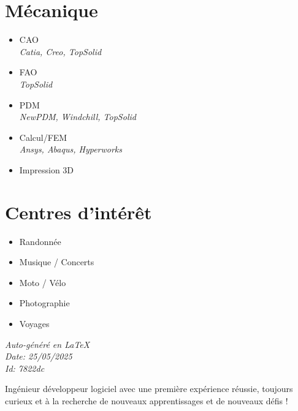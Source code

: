 \documentclass[]{friggeri-cv}
\begin{document}
\begin{aside}
\section{Mécanique}
\begin{itemize}
\item CAO
 \\ \hspace*{0.2em}\small\textit{Catia, Creo, TopSolid}
\item FAO
 \\ \hspace*{0.2em}\small\textit{TopSolid}
\item PDM
 \\ \hspace*{0.2em}\small\textit{NewPDM, Windchill, TopSolid}
\item Calcul/FEM
 \\ \hspace*{0.2em}\small\textit{Ansys, Abaqus, Hyperworks}
\item Impression 3D
\end{itemize}
\section{Centres d'intérêt}
\begin{itemize}
\item Randonnée
\item Musique / Concerts
\item Moto / Vélo
\item Photographie
\item Voyages
\end{itemize}
\vspace{2.5mm}%
\small \emph{Auto-généré en \LaTeX}\\
\small \emph{Date: 25/05/2025} \hspace*{8mm}\\
\small \emph{Id: 7822dc} %

\end{aside}

\vspace*{-2.0mm}
\noindent\parbox{\linewidth}{
  \centering
  Ingénieur développeur logiciel avec une première expérience réussie, toujours curieux et à la recherche de nouveaux apprentissages et de nouveaux défis !
}
\vspace*{0.8mm}
\end{document}

